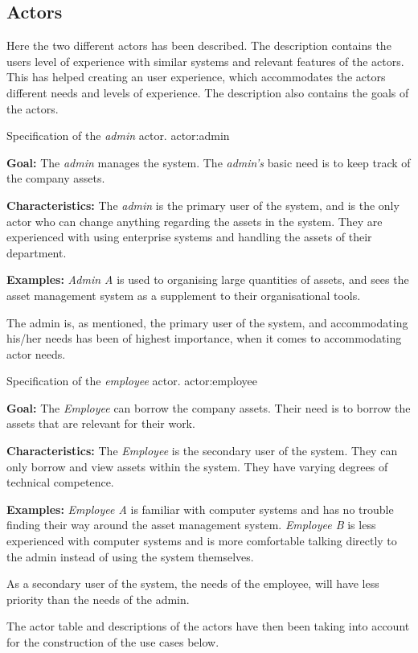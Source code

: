 \subsection{Actors} \label{scc:actors}
Here the two different actors has been described. The description contains the users level of experience with similar systems and relevant features of the actors. This has helped creating an user experience, which accommodates the actors different needs and levels of experience. The description also contains the goals of the actors.

    {Specification of the \textit{admin} actor.}
    {actor:admin}
    {
        \textbf{Goal:} The \textit{admin} manages the system. The \textit{admin's} basic need is to keep track of the company assets.
        \vskip 0.2cm
        
        \textbf{Characteristics:} The \textit{admin} is the primary user of the system, and is the only actor who can change anything regarding the assets in the system. They are experienced with using enterprise systems and handling the assets of their department.
        \vskip 0.2cm
        
        \textbf{Examples:} \textit{Admin A} is used to organising large quantities of assets, and sees the asset management system as a supplement to their organisational tools.
    }

The admin is, as mentioned, the primary user of the system, and accommodating his/her needs has been of highest importance, when it comes to accommodating actor needs.

    {Specification of the \textit{employee} actor.}
    {actor:employee}
    {
        \textbf{Goal:} The \textit{Employee} can borrow the company assets. Their need is to borrow the assets that are relevant for their work.
        \vskip 0.2cm
        
        \textbf{Characteristics:} The \textit{Employee} is the secondary user of the system. They can only borrow and view assets within the system. They have varying degrees of technical competence.
        \vskip 0.2cm
        
        \textbf{Examples:} \textit{Employee A} is familiar with computer systems and has no trouble finding their way around the asset management system.
        \vskip 0.1cm
        \textit{Employee B} is less experienced with computer systems and is more comfortable talking directly to the admin instead of using the system themselves. 
    }
As a secondary user of the system, the needs of the employee, will have less priority than the needs of the admin.
\par
The actor table and descriptions of the actors have then been taking into account for the construction of the use cases below.